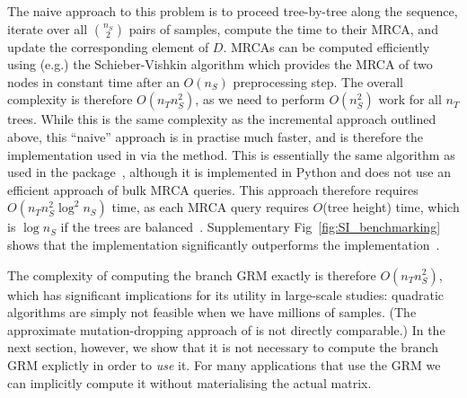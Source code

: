 The naive approach to this problem 
is to proceed tree-by-tree along the sequence,
iterate over all $\binom{n_S}{2}$ pairs of samples, compute the 
time to their MRCA, and update the corresponding element of $D$.
MRCAs can be computed efficiently using (e.g.) the Schieber-Vishkin
algorithm \citep{Schieber1988On,knuth2011combinatorial}
which provides the MRCA of two nodes in constant time
after an $O(n_S)$ preprocessing step.
The overall complexity is therefore $O(n_T n_S^2)$,
as we need to perform $O(n_S^2)$ work for all $n_T$ trees.
While this is the same complexity as the incremental approach outlined
above, this ``naive'' approach is in practise much faster, and 
is therefore the implementation used in \tskit{} via the \tsGRM{} method.
This is essentially the same algorithm as used in the 
\eGRM{} package~\citet{fan2022genealogical}, although it is implemented in
Python and does not use an efficient approach of bulk MRCA queries. 
This approach therefore requires $O(n_T n_S^2 \log^2{n_S})$ time, 
as each MRCA query requires $O$(tree height) time, which is $\log n_S$
if the trees are balanced~\citep{kelleher2016efficient}.
Supplementary Fig~\ref{fig:SI_benchmarking} shows that the \tskit{} implementation 
significantly outperforms the \eGRM{}
implementation~\citep{fan2022genealogical}.

The complexity of computing the branch GRM exactly is therefore $O(n_T n_S^2)$,
which has significant implications for its utility in large-scale studies:
quadratic algorithms are simply not feasible when we have millions 
of samples. 
(The approximate mutation-dropping approach of \citet{zhang2023biobank}
is not directly comparable.)
In the next section, however, we show that it is not necessary
to compute the branch GRM explictly in order to \emph{use} it. For many 
applications that use the GRM we can implicitly compute it without materialising the actual matrix.



